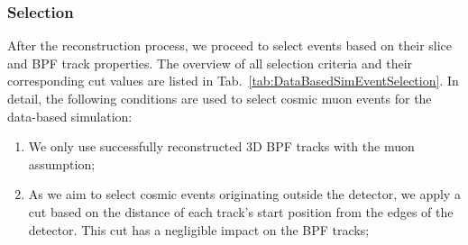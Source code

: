 \subsubsection*{Selection}\label{sec:DataBasedSimSelection}
After the reconstruction process, we proceed to select events based on their slice and \gls{BPF} track properties. The overview of all selection criteria and their corresponding cut values are listed in Tab.~\ref{tab:DataBasedSimEventSelection}. In detail, the following conditions are used to select cosmic muon events for the data-based simulation:
\begin{enumerate}
\item We only use successfully reconstructed 3D \gls{BPF} tracks with the muon assumption;
\item As we aim to select cosmic events originating outside the detector, we apply a cut based on the distance of each track's start position from the edges of the detector. This cut has a negligible impact on the \gls{BPF} tracks;


\end{enumerate}
